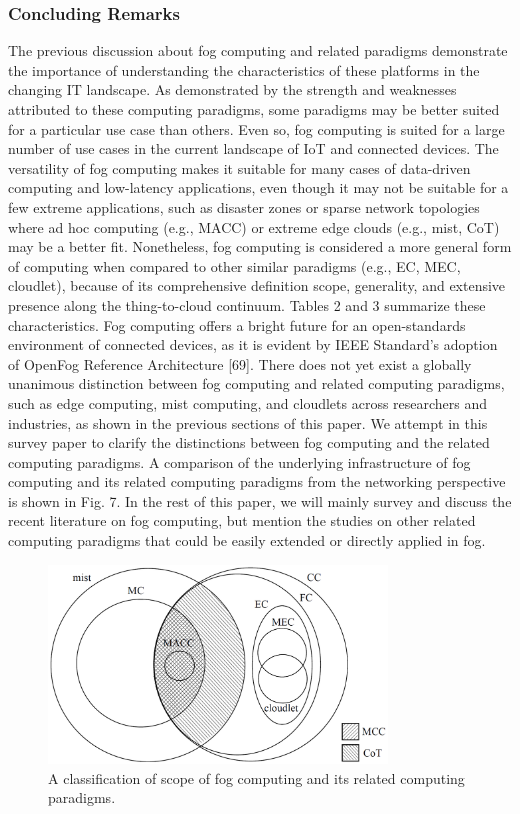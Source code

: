 \subsubsection{Concluding Remarks}
The previous discussion about fog computing and related paradigms demonstrate the importance of understanding the characteristics of these platforms in the changing IT landscape. As demonstrated by the strength and weaknesses attributed to these computing paradigms, some paradigms may be better suited for a particular
use case than others. Even so, fog computing is suited for a large number of use cases in the current landscape of IoT and connected devices. The versatility of fog computing makes it suitable for many cases of data-driven computing and low-latency applications, even though it may not be suitable for a few extreme applications, such as disaster zones or sparse network topologies where ad hoc computing (e.g., MACC) or extreme edge clouds (e.g., mist, CoT) may be a better fit. Nonetheless, fog computing is considered a more general form of computing when compared to other similar paradigms (e.g., EC, MEC, cloudlet), because of its comprehensive definition scope, generality, and extensive presence along the thing-to-cloud continuum. Tables 2 and 3 summarize these characteristics. Fog computing offers a bright future for an open-standards environment of connected devices, as it is evident by IEEE Standard’s adoption of OpenFog Reference Architecture [69]. There does not yet exist a globally unanimous distinction between fog computing and related computing paradigms, such as edge computing, mist computing, and cloudlets across researchers and industries, as shown in the previous sections of this paper. We attempt in this survey paper to clarify the distinctions between fog computing and the related computing paradigms. A comparison of the underlying infrastructure of fog computing and its related computing paradigms from the networking perspective is shown in Fig. 7. In the rest of this paper, we will mainly survey and discuss the recent literature on fog computing, but mention the studies on other related computing paradigms that could be easily extended or directly applied in fog.

\begin{figure}
	\centering
	\includegraphics[width=90mm]{images/computing_paradigms}
	\caption{A classification of scope of fog computing and its related computing paradigms.}
	\label{architecture}
\end{figure}


